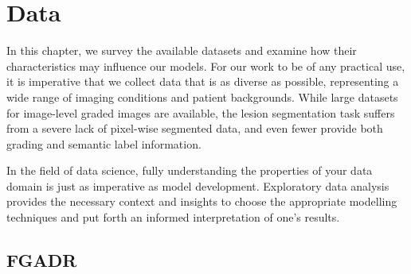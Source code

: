 \chapter{Data} \label{cha:data}

In this chapter, we survey the available datasets and examine how their characteristics may influence our models.
For our work to be of any practical use, it is imperative that we collect data that is as diverse as possible, representing a wide range of imaging conditions and patient backgrounds.
While large datasets for image-level graded images are available, the lesion segmentation task suffers from a severe lack of pixel-wise segmented data, and even fewer provide both grading and semantic label information.

In the field of data science, fully understanding the properties of your data domain is just as imperative as model development.
Exploratory data analysis provides the necessary context and insights to choose the appropriate modelling techniques and put forth an informed interpretation of one's results.

\section{FGADR}

